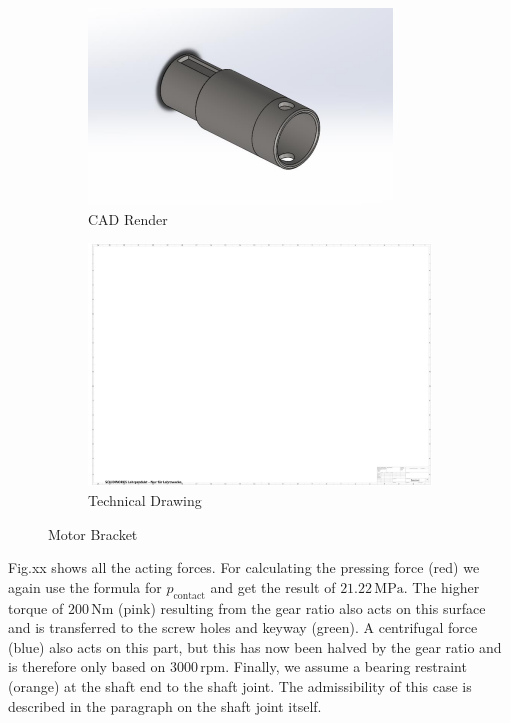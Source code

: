 \begin{figure}[ht!]
  \centering
  \begin{subfigure}{.5\textwidth}
    \centering
    \includegraphics[width=\linewidth]{texfiles/mech/eimg/propulsion/picture_gearshaft_right}
    \caption{CAD Render}
    \label{fig:CAD Motorshaft}
  \end{subfigure}%
  \begin{subfigure}{.5\textwidth}
    \centering
    \includegraphics[width=\linewidth]{texfiles/mech/eimg/propulsion/spaceholder_technical_drawing}
    \caption{Technical Drawing}
    \label{fig:TD Motorshaft}
  \end{subfigure}
  \caption{Motor Bracket}
  \label{fig:Motorshaft}
  \end{figure}



Fig.xx  shows all the acting forces. For calculating the pressing force (red) we again use the formula for \(p_{\text{contact}}\)
and get the result of \(21.22 \, \text{MPa}\). The higher torque of \(200 \, \text{Nm}\) (pink) resulting from the gear ratio also acts on this surface and is transferred to the screw holes and keyway (green). A centrifugal force (blue) also acts on this part, but this has now been halved by the gear ratio and is therefore only based on \(3000 \, \text{rpm}\). Finally, we assume a bearing restraint (orange) at the shaft end to the shaft joint. The admissibility of this case is described in the paragraph on the shaft joint itself.

